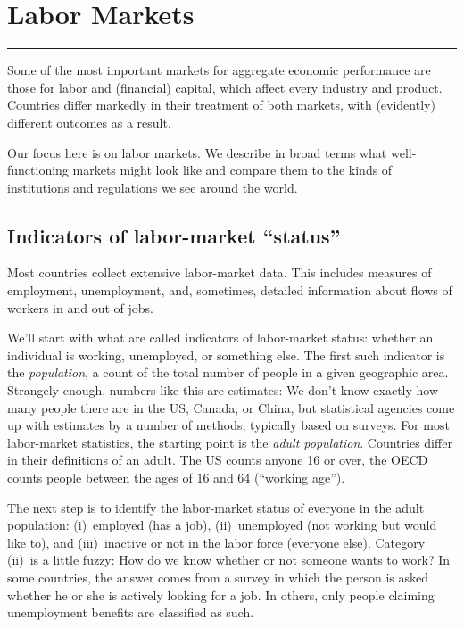 \chapter{Labor Markets}\label{chp:lbmk}
\hypertarget{labor}{}
\label{ch:labor}


\rule{\textwidth}{1pt}

Some of the most important markets for aggregate economic performance
are those for labor and (financial) capital,
which affect every industry and product.
Countries differ markedly in their treatment of both markets,
with (evidently) different outcomes as a result.

Our focus here is on labor markets.
We describe in broad terms what well-functioning markets might look like
and compare them to the kinds of institutions and regulations we see around the world.


\section{Indicators of labor-market ``status''}

Most countries collect extensive labor-market data.
This includes measures of employment, unemployment,
and, sometimes, detailed information about flows of workers
in and out of jobs.

We'll start with what are called indicators of labor-market status:
whether an individual is working, unemployed, or something else.
The first such indicator is the {\it population\/},  a count of the total number of people in a given geographic area.
Strangely enough, numbers like this are estimates: We don't know exactly how many people there are in
the US, Canada, or China, but statistical agencies come up
with estimates by a number of methods, typically based on surveys.
For most labor-market statistics,
the starting point is the
{\it adult population\/}. 
Countries differ in their definitions of an adult.
The US counts anyone 16 or over,
the OECD counts people between the ages of 16 and 64
(``working age'').

The next step is to identify the labor-market status of everyone
in the adult population:
(i)~employed (has a job), (ii)~unemployed (not working but would like to),
and (iii)~inactive or not in the labor force (everyone else). 
Category (ii)~is a little fuzzy:  How do we know whether or not
someone wants to work? In some countries, the answer comes from a
survey in which the person is asked whether he or she is actively looking
for a job. In others, only people claiming unemployment benefits
are classified as such.

